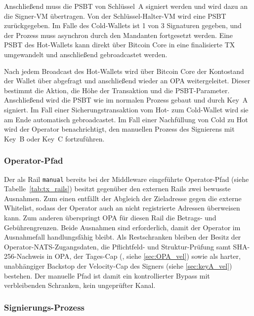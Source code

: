 Anschließend muss die \ac{PSBT} von Schlüssel~A signiert werden und wird dazu an die Signer-\ac{VM} übertragen. Von der Schlüssel-Halter-\ac{VM} wird eine \ac{PSBT} zurückgegeben. Im Falle des Cold-Wallets ist 1 von 3 Signaturen gegeben, und der Prozess muss asynchron durch den Mandanten fortgesetzt werden. Eine \ac{PSBT} des Hot-Wallets kann direkt über Bitcoin Core in eine finalisierte \ac{TX} umgewandelt und anschließend gebroadcastet werden.

Nach jedem Broadcast des Hot-Wallets wird über Bitcoin Core der Kontostand der Wallet über  abgefragt und anschließend wieder an \ac{OPA} weitergeleitet. Dieser bestimmt die Aktion, die Höhe der Transaktion und die \ac{PSBT}-Parameter. Anschließend wird die \ac{PSBT} wie im normalen Prozess gebaut und durch Key~A signiert. Im Fall einer Sicherungstransaktion vom Hot- zum Cold-Wallet wird sie am Ende automatisch gebroadcastet. Im Fall einer Nachfüllung von Cold zu Hot wird der Operator benachrichtigt, den manuellen Prozess des Signierens mit Key~B oder Key~C fortzuführen.

\subsubsection{Operator-Pfad}

Der als Rail \texttt{manual} bereits bei der Middleware eingeführte Operator-Pfad (siehe Tabelle~\ref{tab:tx_rails}) besitzt gegenüber den externen Rails zwei bewusste Ausnahmen.
Zum einen entfällt der Abgleich der Zieladresse gegen die externe Whitelist, sodass der Operator auch an nicht registrierte Adressen überweisen kann. Zum anderen überspringt \ac{OPA} für diesen Rail die Betrags- und Gebührengrenzen. Beide Ausnahmen sind erforderlich, damit der Operator im Ausnahmefall handlungsfähig bleibt. 
Als Restschranken bleiben der Besitz der Operator-\ac{NATS}-Zugangsdaten, die Pflichtfeld- und Struktur-Prüfung samt SHA-256-Nachweis in \ac{OPA}, der Tages-Cap (\texttt{}, siehe \ref{sec:OPA_vel}) sowie als harter, unabhängiger Backstop der Velocity-Cap des Signers (siehe \ref{sec:keyA_vel}) bestehen. Der manuelle Pfad ist damit ein kontrollierter Bypass mit verbleibenden Schranken, kein ungeprüfter Kanal.

\subsubsection{Signierungs-Prozess} \label{sec:sparrow_signierung}

